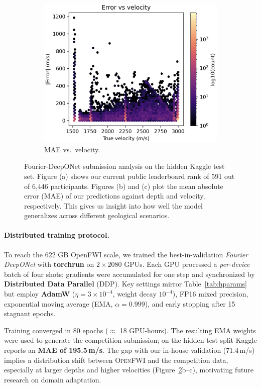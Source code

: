 \documentclass{article}
\begin{document}
\begin{figure}[t]
\begin{subfigure}[b]{0.32\linewidth}
        \centering
        \includegraphics[width=\linewidth]{figures/fdonet_error_velocity.png}
        \caption{MAE vs.\ velocity.}
        \label{fig:fdonet_vel}
    \end{subfigure}
    \vspace{-4pt}
    \caption{Fourier-DeepONet submission analysis on the hidden Kaggle test set. Figure (a) shows our current public leaderboard rank of 591 out of 6,446 participants. Figures (b) and (c) plot the mean absolute error (MAE) of our predictions against depth and velocity, respectively. This gives us insight into how well the model generalizes across different geological scenarios.}
    \label{fig:kaggle_triptych}
\end{figure}

\paragraph{Distributed training protocol.} To reach the 622 GB OpenFWI scale, we trained the best-in-validation \emph{Fourier DeepONet} with \textbf{torchrun} on $2 \times 2080$ GPUs.  
Each GPU processed a \textit{per-device} batch of four shots; gradients were accumulated for one step and synchronized by \textbf{Distributed Data Parallel} (DDP).  Key settings mirror Table~\ref{tab:hparams} but employ \textbf{AdamW} ($\eta =3\times10^{-4}$, weight decay $10^{-4}$), FP16 mixed precision, exponential moving average (EMA, $\alpha=0.999$), and early stopping after 15 stagnant epochs.  

Training converged in $80$ epochs (\(\approx\) 18 GPU-hours).  
The resulting EMA weights were used to generate the competition submission; on the hidden test split Kaggle reports an \textbf{MAE of 195.5\,m/s}.  
The gap with our in-house validation (71.4\,m/s) implies a distribution shift between \textsc{OpenFWI} and the competition data, especially at larger depths and higher velocities (Figure~\ref{fig:kaggle_triptych}b–c), motivating future research on domain adaptation.
\end{document}
